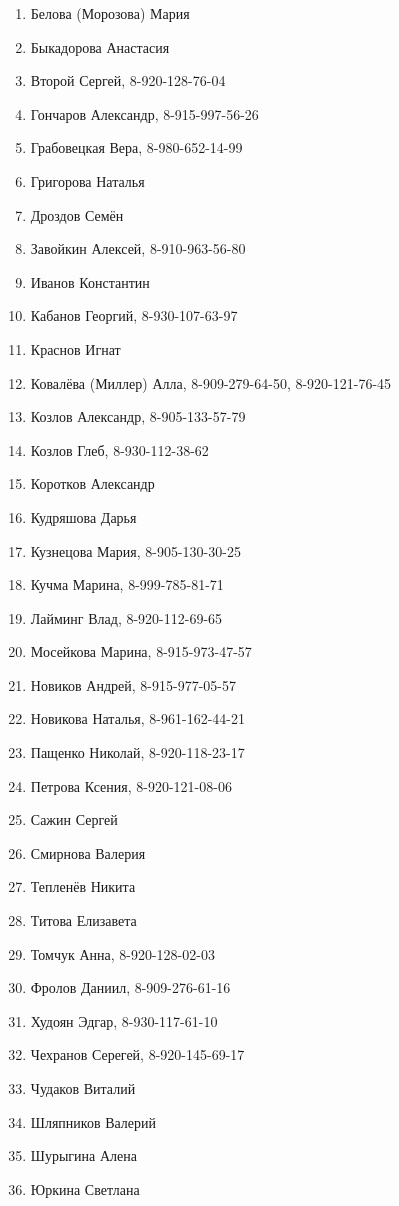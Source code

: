 \begin{enumerate}
\item Белова (Морозова) Мария
\item Быкадорова Анастасия
\item Второй Сергей, 8-920-128-76-04
\item Гончаров Александр, 8-915-997-56-26
\item Грабовецкая Вера, 8-980-652-14-99
\item Григорова Наталья
\item Дроздов Семён
\item Завойкин Алексей, 8-910-963-56-80
\item Иванов Константин
\item Кабанов Георгий, 8-930-107-63-97
\item Краснов Игнат
\item Ковалёва (Миллер) Алла, 8-909-279-64-50, 8-920-121-76-45
\item Козлов Александр, 8-905-133-57-79
\item Козлов Глеб, 8-930-112-38-62
\item Коротков Александр
\item Кудряшова Дарья
\item Кузнецова Мария, 8-905-130-30-25
\item Кучма Марина, 8-999-785-81-71
\item Лайминг Влад, 8-920-112-69-65
\item Мосейкова Марина, 8-915-973-47-57
\item Новиков Андрей, 8-915-977-05-57
\item Новикова Наталья, 8-961-162-44-21
\item Пащенко Николай, 8-920-118-23-17
\item Петрова Ксения, 8-920-121-08-06
\item Сажин Сергей
\item Смирнова Валерия
\item Тепленёв Никита
\item Титова Елизавета
\item Томчук Анна, 8-920-128-02-03
\item Фролов Даниил, 8-909-276-61-16
\item Худоян Эдгар, 8-930-117-61-10
\item Чехранов Серегей, 8-920-145-69-17
\item Чудаков Виталий
\item Шляпников Валерий
\item Шурыгина Алена
\item Юркина Светлана
\end{enumerate}
